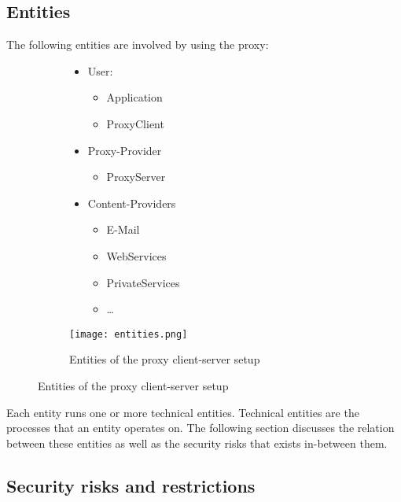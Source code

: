 \documentclass[12pt, a4paper]{scrartcl}
\begin{document}
\subsection{Entities}
The following entities are involved by using the proxy:
\begin{figure}[H]
    \centering
    \begin{subfigure}{0.45\textwidth}
        \begin{itemize}
            \item User:
            \begin{itemize}
                \item Application
                \item ProxyClient
            \end{itemize}
            \item Proxy-Provider
            \begin{itemize}
                \item ProxyServer
            \end{itemize}
            \item Content-Providers
            \begin{itemize}
                \item E-Mail
                \item WebServices
                \item PrivateServices
                \item \ldots
            \end{itemize}
        \end{itemize}
    \end{subfigure}
    \begin{subfigure}{0.5\textwidth}
        \centering
        \texttt{[image: entities.png]}
        \caption{Entities of the proxy client-server setup}
        \label{fig::enti}
    \end{subfigure}
\end{figure}

\noindent Each entity runs one or more technical entities. Technical entities are the processes that an entity operates on.\newline
The following section discusses the relation between these entities as well as the security risks that exists in-between them.

\subsection{Security risks and restrictions}
\end{document}
